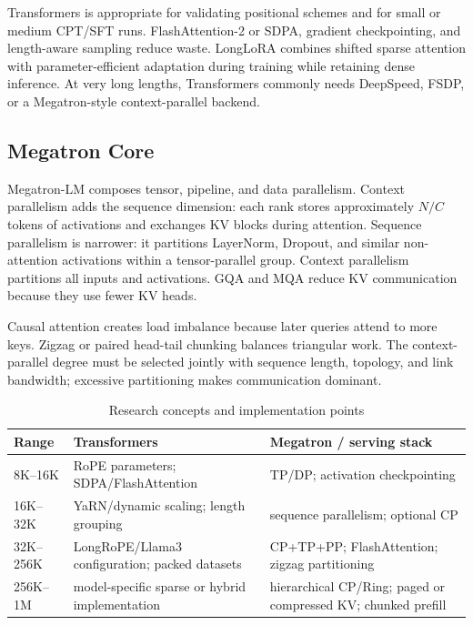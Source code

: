 \documentclass[UTF8,10pt,a4paper,fontset=none]{ctexart}
\begin{document}
Transformers is appropriate for validating positional schemes and for small or medium CPT/SFT runs. FlashAttention-2 or SDPA, gradient checkpointing, and length-aware sampling reduce waste. LongLoRA combines shifted sparse attention with parameter-efficient adaptation during training while retaining dense inference\cite{chen2023longlora}. At very long lengths, Transformers commonly needs DeepSpeed, FSDP, or a Megatron-style context-parallel backend.

\subsection{Megatron Core}
Megatron-LM composes tensor, pipeline, and data parallelism\cite{narayanan2021megatron}. Context parallelism adds the sequence dimension: each rank stores approximately $N/C$ tokens of activations and exchanges KV blocks during attention\cite{megatroncp}. Sequence parallelism is narrower: it partitions LayerNorm, Dropout, and similar non-attention activations within a tensor-parallel group. Context parallelism partitions all inputs and activations. GQA and MQA reduce KV communication because they use fewer KV heads\cite{ainslie2023gqa}.

Causal attention creates load imbalance because later queries attend to more keys. Zigzag or paired head-tail chunking balances triangular work. The context-parallel degree must be selected jointly with sequence length, topology, and link bandwidth; excessive partitioning makes communication dominant.

\begin{table}[htbp]
\centering\small
\caption{Research concepts and implementation points}
\begin{tabularx}{\textwidth}{p{2cm}X X}
\toprule
Range & Transformers & Megatron / serving stack\\
\midrule
8K--16K & RoPE parameters; SDPA/FlashAttention & TP/DP; activation checkpointing\\
16K--32K & YaRN/dynamic scaling; length grouping & sequence parallelism; optional CP\\
32K--256K & LongRoPE/Llama3 configuration; packed datasets & CP+TP+PP; FlashAttention; zigzag partitioning\\
256K--1M & model-specific sparse or hybrid implementation & hierarchical CP/Ring; paged or compressed KV; chunked prefill\\
\bottomrule
\end{tabularx}
\end{table}
\end{document}
